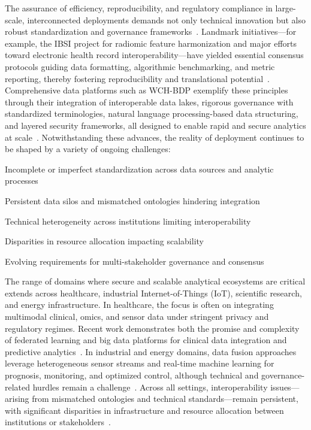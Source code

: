\documentclass[sigconf]{acmart}
\begin{document}
The assurance of efficiency, reproducibility, and regulatory compliance in large-scale, interconnected deployments demands not only technical innovation but also robust standardization and governance frameworks~\cite{ref4,ref33,ref41,ref43,ref51,ref54,ref61,ref62,ref64,ref65,ref70,ref71,ref72,ref75,ref77,ref79,ref80,ref84,ref106,ref107}. Landmark initiatives—for example, the IBSI project for radiomic feature harmonization and major efforts toward electronic health record interoperability—have yielded essential consensus protocols guiding data formatting, algorithmic benchmarking, and metric reporting, thereby fostering reproducibility and translational potential~\cite{ref40,ref41,ref44,ref45,ref104}. Comprehensive data platforms such as WCH-BDP exemplify these principles through their integration of interoperable data lakes, rigorous governance with standardized terminologies, natural language processing-based data structuring, and layered security frameworks, all designed to enable rapid and secure analytics at scale~\cite{ref36,ref84}. Notwithstanding these advances, the reality of deployment continues to be shaped by a variety of ongoing challenges:

Incomplete or imperfect standardization across data sources and analytic processes

Persistent data silos and mismatched ontologies hindering integration

Technical heterogeneity across institutions limiting interoperability

Disparities in resource allocation impacting scalability

Evolving requirements for multi-stakeholder governance and consensus

The range of domains where secure and scalable analytical ecosystems are critical extends across healthcare, industrial Internet-of-Things (IoT), scientific research, and energy infrastructure. In healthcare, the focus is often on integrating multimodal clinical, omics, and sensor data under stringent privacy and regulatory regimes. Recent work demonstrates both the promise and complexity of federated learning and big data platforms for clinical data integration and predictive analytics~\cite{ref36,ref84,ref90,ref51,ref54}. In industrial and energy domains, data fusion approaches leverage heterogeneous sensor streams and real-time machine learning for prognosis, monitoring, and optimized control, although technical and governance-related hurdles remain a challenge~\cite{ref71,ref72,ref75,ref76,ref77}. Across all settings, interoperability issues—arising from mismatched ontologies and technical standards—remain persistent, with significant disparities in infrastructure and resource allocation between institutions or stakeholders~\cite{ref82,ref84}.
\end{document}
